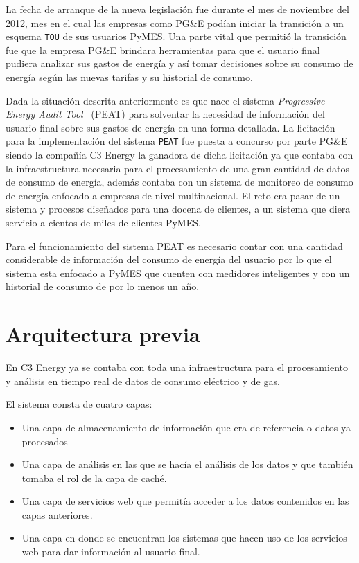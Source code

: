 La fecha de arranque de la nueva legislación fue durante el mes de noviembre
del 2012, mes en el cual las empresas como PG\&E podían iniciar la transición
a un esquema \texttt{TOU} de sus usuarios PyMES.
Una parte vital que permitió la transición fue que la empresa PG\&E brindara
herramientas para que el usuario final pudiera analizar sus gastos de energía
y así tomar decisiones sobre su consumo de energía según las nuevas tarifas
y su historial de consumo.

Dada la situación descrita anteriormente es que nace el sistema
\textit{Progressive Energy Audit Tool} \ (PEAT) para solventar la necesidad
de información del usuario final sobre sus gastos de energía en una forma detallada.
La licitación para la implementación del sistema \texttt{PEAT} fue puesta
a concurso por parte PG\&E siendo la compañía C3 Energy la ganadora de dicha
licitación  ya que contaba con la infraestructura necesaria para el
procesamiento de una gran cantidad de datos de consumo de energía,
además contaba con un sistema de monitoreo de consumo de energía enfocado
a empresas de nivel multinacional. El reto era pasar de un sistema y procesos
diseñados para una docena de clientes, a un sistema que diera servicio a
cientos de miles de clientes PyMES.

Para el funcionamiento del sistema PEAT es necesario contar con una cantidad
considerable de información del consumo de energía del usuario por lo que
el sistema esta enfocado a PyMES que cuenten con medidores inteligentes y
con un historial de consumo de por lo menos un año.

\section{Arquitectura previa}
En C3 Energy ya se contaba con toda una infraestructura para el
procesamiento y análisis en tiempo real de datos de consumo eléctrico
y de gas.

\vspace{2.5mm}

El sistema consta de cuatro capas:

\begin{itemize}
\item Una capa de almacenamiento de información que era de referencia
  o datos ya procesados
\item Una capa de análisis en las que se hacía el análisis de los datos
  y que también tomaba el rol de la capa de caché.
\item Una capa de servicios web que permitía acceder a los datos contenidos
  en las capas anteriores.
\item Una capa en donde se encuentran los sistemas que hacen uso de los
  servicios web para dar información al usuario final.
\end{itemize}

